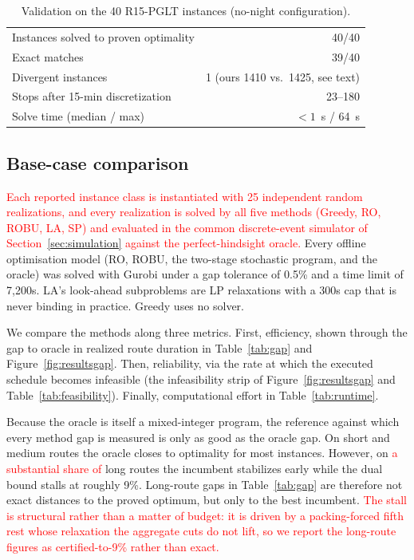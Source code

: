 \documentclass[preprint,12pt,3p]{elsarticle}
\newcommand{\red}[1]{\textcolor{red}{#1}}
\begin{document}
\begin{table}[htbp]
\centering
\caption{Validation on the 40 R15-PGLT instances (no-night configuration).}
\label{tab:validation}
\small
\begin{tabular}{lr}
\toprule
Instances solved to proven optimality & 40/40 \\
Exact matches & 39/40 \\
Divergent instances & 1 (ours 1410 vs.\ 1425, see text) \\
Stops after 15-min discretization & 23--180 \\
Solve time (median / max) & $<1$~s / 64~s \\
\bottomrule
\end{tabular}
\end{table}


\subsection{Base-case comparison}
\label{sec:basecase}

\red{Each reported instance class is instantiated with 25 independent random
realizations, and every realization is solved by all five methods (Greedy, RO,
ROBU, LA, SP) and evaluated in the common discrete-event simulator of
Section~\ref{sec:simulation} against the perfect-hindsight oracle.}
Every offline optimisation model (RO, ROBU, the two-stage stochastic program, and the oracle) was solved with Gurobi under a gap tolerance of 0.5\% and a time limit of 7,200s. LA's look-ahead subproblems are LP relaxations with a 300s cap that is never binding in practice. Greedy uses no solver.

We compare the methods along three metrics. First, efficiency, shown through the gap to oracle in realized route duration in Table~\ref{tab:gap} and Figure~\ref{fig:resultsgap}. Then, reliability, via the rate at which the executed schedule becomes infeasible (the infeasibility strip of Figure~\ref{fig:resultsgap} and Table~\ref{tab:feasibility}). Finally, computational effort in Table~\ref{tab:runtime}.


Because the oracle is itself a mixed-integer program, the reference against which every method gap is measured is only as good as the oracle gap.
On short and medium routes the oracle closes to optimality for most instances. However, on \red{a substantial share of} long routes the incumbent stabilizes early while the dual bound stalls at roughly 9\%. Long-route gaps in Table~\ref{tab:gap} are therefore not exact distances to the proved optimum, but only to the best incumbent. \red{The stall is structural rather than a matter of budget: it is driven by a packing-forced fifth rest whose relaxation the aggregate cuts do not lift, so we report the long-route figures as certified-to-9\% rather than exact.}
\end{document}
